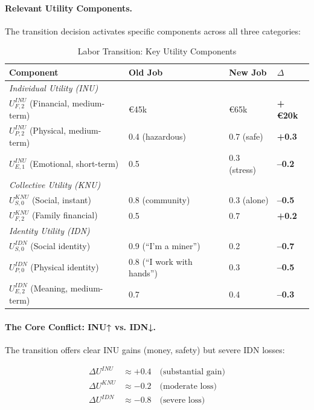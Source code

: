 \paragraph{Relevant Utility Components.}
The transition decision activates specific components across all three categories:

\begin{table}[htbp]
\centering
\caption{Labor Transition: Key Utility Components}
\label{tab:labor-components}
\small
\renewcommand{\arraystretch}{1.2}
\begin{tabular}{@{}llll@{}}
\toprule
\textbf{Component} & \textbf{Old Job} & \textbf{New Job} & \textbf{$\Delta$} \\
\midrule
\multicolumn{4}{l}{\textit{Individual Utility (INU)}} \\
$U^{INU}_{F,2}$ (Financial, medium-term) & \euro{45k} & \euro{65k} & \textbf{+\euro{20k}} \\
$U^{INU}_{P,2}$ (Physical, medium-term) & 0.4 (hazardous) & 0.7 (safe) & \textbf{+0.3} \\
$U^{INU}_{E,1}$ (Emotional, short-term) & 0.5 & 0.3 (stress) & \textbf{--0.2} \\
\midrule
\multicolumn{4}{l}{\textit{Collective Utility (KNU)}} \\
$U^{KNU}_{S,0}$ (Social, instant) & 0.8 (community) & 0.3 (alone) & \textbf{--0.5} \\
$U^{KNU}_{F,2}$ (Family financial) & 0.5 & 0.7 & \textbf{+0.2} \\
\midrule
\multicolumn{4}{l}{\textit{Identity Utility (IDN)}} \\
$U^{IDN}_{S,0}$ (Social identity) & 0.9 (``I'm a miner'') & 0.2 & \textbf{--0.7} \\
$U^{IDN}_{P,0}$ (Physical identity) & 0.8 (``I work with hands'') & 0.3 & \textbf{--0.5} \\
$U^{IDN}_{E,2}$ (Meaning, medium-term) & 0.7 & 0.4 & \textbf{--0.3} \\
\bottomrule
\end{tabular}
\end{table}

\paragraph{The Core Conflict: INU↑ vs. IDN↓.}
The transition offers clear INU gains (money, safety) but severe IDN losses:

\begin{align}
\Delta U^{INU} &\approx +0.4 \quad \text{(substantial gain)} \\
\Delta U^{KNU} &\approx -0.2 \quad \text{(moderate loss)} \\
\Delta U^{IDN} &\approx -0.8 \quad \text{(severe loss)}
\end{align}

